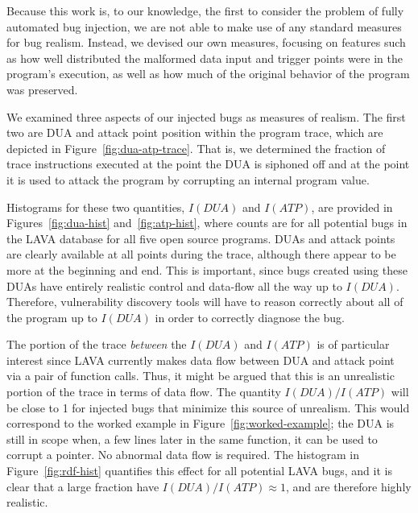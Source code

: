 Because this work is, to our knowledge, the first to consider the problem of fully automated bug injection, we are not able to make use of any standard measures for bug realism.
Instead, we devised our own measures, focusing on features such as how well distributed the malformed data input and trigger points were in the program's execution, as well as how much of the original behavior of the program was preserved.

We examined three aspects of our injected bugs as measures of realism. 
The first two are DUA and attack point position within the program trace, which are depicted in Figure~\ref{fig:dua-atp-trace}.
That is, we determined the fraction of trace instructions executed at the point the DUA is siphoned off and at the point it is used to attack the program by corrupting an internal program value.

Histograms for these two quantities, $I(DUA)$ and $I(ATP)$, are provided in Figures~\ref{fig:dua-hist} and~\ref{fig:atp-hist}, where counts are for all potential bugs in the LAVA database for all five open source programs. 
DUAs and attack points are clearly available at all points during the trace, although there appear to be more at the beginning and end.
This is important, since bugs created using these DUAs have entirely realistic control and data-flow all the way up to $I(DUA)$.
Therefore, vulnerability discovery tools will have to reason correctly about all of the program up to $I(DUA)$ in order to correctly diagnose the bug.

The portion of the trace \emph{between} the $I(DUA)$ and $I(ATP)$ is of particular interest since LAVA currently makes data flow between DUA and attack point via a pair of function calls.
Thus, it might be argued that this is an unrealistic portion of the trace in terms of data flow.
The quantity $I(DUA)/I(ATP)$ will be close to 1 for injected bugs that minimize this source of unrealism.
This would correspond to the worked example in Figure~\ref{fig:worked-example}; the DUA is still in scope when, a few lines later in the same function, it can be used to corrupt a pointer.
No abnormal data flow is required.
The histogram in Figure~\ref{fig:rdf-hist} quantifies this effect for all potential LAVA bugs, and it is clear that a large fraction have $I(DUA)/I(ATP) \approx 1$, and are therefore highly realistic.

